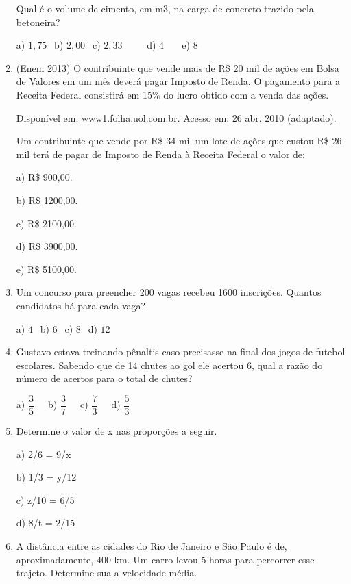 \begin{multicols*}{2}
\begin{enumerate}
              Qual é o volume de cimento, em m3, na carga de concreto trazido pela betoneira?

              a) $1,75 \ \ $ b) $2,00 \ \ $ c) $2,33 \ \ \ \ \ \ \ \ \ \ $ d) $4 \ \ \ \ \ \ \ $ e) $8 \ \ $

        \item (Enem 2013) O contribuinte que vende mais de R\$ 20 mil de ações em Bolsa de Valores em um mês deverá pagar Imposto de Renda. O pagamento para a Receita Federal consistirá em 15\% do lucro obtido com a venda das ações.

              Disponível em: www1.folha.uol.com.br. Acesso em: 26
              abr. 2010 (adaptado).

              Um contribuinte que vende por R\$ 34 mil um lote de ações que custou R\$ 26 mil terá de pagar de Imposto de Renda à
              Receita Federal o valor de:

              a) R\$ 900,00.

              b) R\$ 1200,00.

              c) R\$ 2100,00.

              d) R\$ 3900,00.

              e) R\$ 5100,00.\\

        \item Um concurso para preencher 200 vagas recebeu 1600 inscrições. Quantos candidatos há para cada vaga?

              a) $4 \ \ $ b) $6 \ \ $ c) $8 \ \ $ d) $12 \ \ $

        \item Gustavo estava treinando pênaltis caso precisasse na final dos jogos de futebol escolares. Sabendo que de 14 chutes ao gol ele acertou 6, qual a razão do número de acertos para o total de chutes?

              a) $\dfrac{3}{5} \ \ \ \ \ $ b) $\dfrac{3}{7} \ \ \ \ \ $ c) $\dfrac{7}{3} \ \ \ \ \ $ d) $\dfrac{5}{3} $

        \item Determine o valor de x nas proporções a seguir.

              a) 2/6 = 9/x

              b) 1/3 = y/12

              c) z/10 = 6/5

              d) 8/t = 2/15\\

        \item A distância entre as cidades do Rio de Janeiro e São Paulo é de, aproximadamente, 400 km. Um carro levou 5 horas para percorrer esse trajeto. Determine sua a velocidade média.\\


\end{enumerate}
\end{multicols*}

